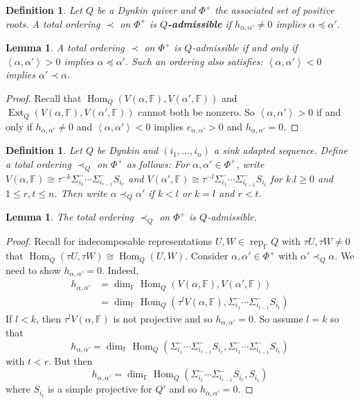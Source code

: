 \documentclass{book}
\newtheorem{lemma}[theorem]{Lemma}
\newtheorem{definition}[theorem]{Definition}
\DeclareMathOperator{\Hom}{Hom}
\DeclareMathOperator{\rep}{rep}
\DeclareMathOperator{\Ext}{Ext}
\begin{document}
    \begin{definition}
        Let $Q$ be a Dynkin quiver and $\Phi^+$ the associated set of positive roots. A total ordering $\prec$ on $\Phi^+$ is \textbf{$Q$-admissible} if $h_{\alpha,\alpha'}\neq 0$ implies $\alpha\preceq\alpha'.$
    \end{definition}
    
    \begin{lemma}
        A total ordering $\prec$ on $\Phi^+$ is $Q$-admissible if and only if $\left<\alpha,\alpha'\right>>0$ implies $\alpha\preceq\alpha'.$ Such an ordering also satisfies: $\left<\alpha,\alpha'\right><0$ implies $\alpha'\prec\alpha.$
    \end{lemma}
    
    \begin{proof}
        Recall that $\Hom_Q(V(\alpha,\mathbb{F}),V(\alpha',\mathbb{F}))$ and $\Ext_Q(V(\alpha,\mathbb{F}),V(\alpha',\mathbb{F}))$ cannot both be nonzero. So $\left<\alpha,\alpha'\right>>0$ if and only if $h_{\alpha,\alpha'}\neq 0$ and $\left<\alpha,\alpha'\right><0$ implies $e_{\alpha,\alpha'}>0$ and $h_{\alpha,\alpha'}=0.$
    \end{proof}
    
    \begin{definition}
        Let $Q$ be Dynkin and $(i_1,\ldots,i_n)$ a sink adapted sequence. Define a total ordering $\prec_Q$ on $\Phi^+$ as follows: For $\alpha,\alpha'\in\Phi^+$, write $V(\alpha,\mathbb{F})\cong\tau^{-k}\Sigma_{i_1}^-\cdots\Sigma_{i_{r-1}}^-S_{i_r}$ and $V(\alpha',\mathbb{F})\cong\tau^{-l}\Sigma_{i_1}^-\cdots\Sigma_{i_{t-1}}^-S_{i_t}$ for $k.l\geq 0$ and $1\leq r,t\leq n$. Then write $\alpha\prec_Q\alpha'$ if $k<l$ or $k=l$ and $r<t$.
    \end{definition}
    
    \begin{lemma}
        The total ordering $\prec_Q$ on $\Phi^+$ is $Q$-admissible.
    \end{lemma}
    
    \begin{proof}
        Recall for indecomposable representations $U,W\in\rep_\mathbb{F}Q$ with $\tau U,\tau W\neq 0$ that $\Hom_Q(\tau U,\tau W)\cong\Hom_Q(U,W).$ Consider $\alpha,\alpha'\in\Phi^+$ with $\alpha'\prec_Q\alpha$. We need to show $h_{\alpha,\alpha'}=0.$ Indeed, 
        \begin{align*}
            h_{\alpha,\alpha'}&=\dim_\mathbb{F}\Hom_Q(V(\alpha,\mathbb{F}),V(\alpha',\mathbb{F}))\\
            &=\dim_\mathbb{F}\Hom_Q(\tau^lV(\alpha,\mathbb{F}),\Sigma_{i_1}^-\cdots\Sigma_{i_{t-1}}^-S_{i_t})
        \end{align*}
        If $l<k$, then $\tau^l V(\alpha,\mathbb{F})$ is not projective and so $h_{\alpha,\alpha'}=0.$ So assume $l=k$ so that \[h_{\alpha,\alpha'}=\dim_\mathbb{F}\Hom_Q(\Sigma_{i_1}^-\cdots\Sigma_{i_{r-1}}^-S_{i_r},\Sigma_{i_1}^-\cdots\Sigma_{i_{t-1}}^-S_{i_t})\] with $t<r$. But then \[h_{\alpha,\alpha'}=\dim_\mathbb{F}\Hom_Q(\Sigma_{i_t}^-\cdots\Sigma_{i_{r-1}}^-S_{i_r},S_{i_t})\] where $S_{i_t}$ is a simple projective for $Q'$ and so $h_{\alpha,\alpha'}=0.$
     \end{proof}
     
\end{document}

